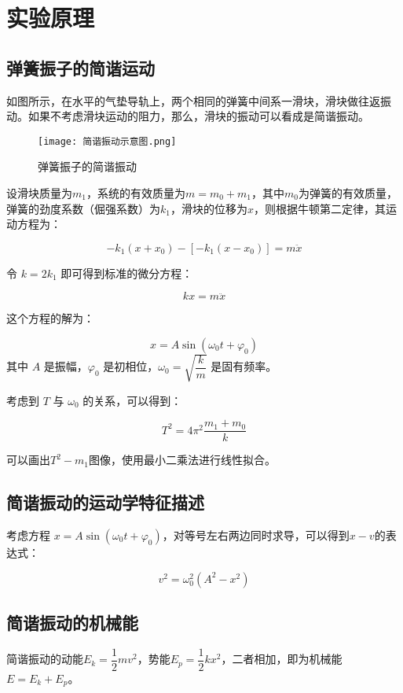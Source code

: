 \documentclass[11pt]{article}
\begin{document}
\section{实验原理}

\subsection{弹簧振子的简谐运动}

如图所示，在水平的气垫导轨上，两个相同的弹簧中间系一滑块，滑块做往返振动。如果不考虑滑块运动的阻力，那么，滑块的振动可以看成是简谐振动。

\begin{figure}[H]
    \centering
    \texttt{[image: 简谐振动示意图.png]}
    \caption{弹簧振子的简谐振动}
\end{figure}

设滑块质量为$m_1$，系统的有效质量为$m = m_0 + m_1$，其中$m_0$为弹簧的有效质量，弹簧的劲度系数（倔强系数）为$k_1$，滑块的位移为$x$，则根据牛顿第二定律，其运动方程为：

\[-k_1 (x+x_0) - [-k_1 (x-x_0)] = m \ddot{x}\]

令 $k = 2k_1$ 即可得到标准的微分方程：

\[kx = m \ddot{x}\]

这个方程的解为：

\[x = A \sin (\omega_0 t + \varphi_0)\]
其中 $A$ 是振幅，$\varphi_0$ 是初相位，$\omega_0 = \sqrt{\dfrac{k}{m}}$ 是固有频率。

考虑到 $T$ 与 $\omega_0$ 的关系，可以得到：

\[T^2 = 4 \pi^2 \frac{m_1 + m_0}{k}\]

可以画出$T^2 - m_1$图像，使用最小二乘法进行线性拟合。

\subsection{简谐振动的运动学特征描述}

考虑方程 $x = A \sin (\omega_0 t + \varphi_0)$，对等号左右两边同时求导，可以得到$x - v$的表达式：

\[v^2 = \omega_0^2 (A^2 - x^2)\]

\subsection{简谐振动的机械能}

简谐振动的动能$E_k = \dfrac{1}{2} mv^2$，势能$E_p = \dfrac{1}{2} kx^2$，二者相加，即为机械能$E = E_k + E_p$。
\end{document}

